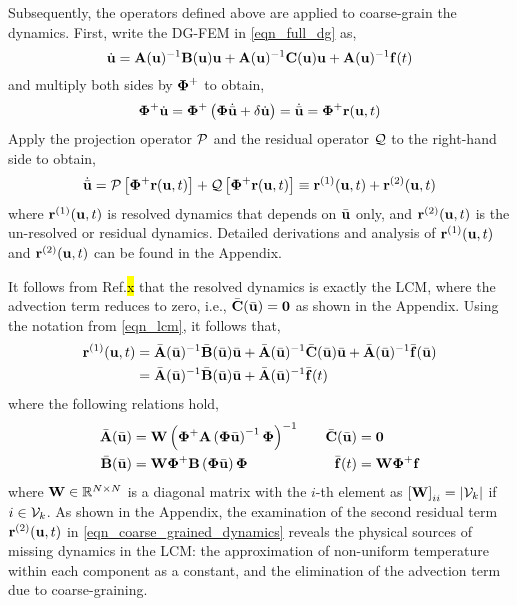 Subsequently, the operators defined above are applied to coarse-grain the dynamics. First, write the DG-FEM in \cref{eqn_full_dg} as,
\begin{equation}
    \dot{\mathbf{u}} = \mathbf{A}(\mathbf{u})^{-1}\mathbf{B}(\mathbf{u})\mathbf{u} + \mathbf{A}(\mathbf{u})^{-1}\mathbf{C}(\mathbf{u})\mathbf{u} + \mathbf{A}(\mathbf{u})^{-1}\mathbf{f}(t)\label{eqn_full_dg_rearranged}
\end{equation}
and multiply both sides by $\boldsymbol{\Phi}^{+}$ to obtain,
\begin{equation}
    \boldsymbol{\Phi}^{+}\dot{\mathbf{u}} = \boldsymbol{\Phi}^{+}\left(\boldsymbol{\Phi}\dot{\bar{\mathbf{u}}} + \delta\dot{\mathbf{u}}\right) = \dot{\bar{\mathbf{u}}} = \boldsymbol{\Phi}^{+}\mathbf{r}(\mathbf{u},t)
\end{equation}
Apply the projection operator $\mathcal{P}$ and the residual operator $\mathcal{Q}$ to the right-hand side to obtain,
\begin{equation}
    \dot{\bar{\mathbf{u}}} = \mathcal{P}\left[\boldsymbol{\Phi}^{+}\mathbf{r}(\mathbf{u},t)\right] + \mathcal{Q}\left[\boldsymbol{\Phi}^{+}\mathbf{r}(\mathbf{u},t)\right]\equiv \mathbf{r}^{(1)}(\mathbf{u},t) + \mathbf{r}^{(2)}(\mathbf{u},t)\label{eqn_coarse_grained_dynamics}
\end{equation}
where $\mathbf{r}^{(1)}(\mathbf{u},t)$ is resolved dynamics that depends on $\bar{\mathbf{u}}$ only, and $\mathbf{r}^{(2)}(\mathbf{u},t)$ is the un-resolved or residual dynamics. Detailed derivations and analysis of $\mathbf{r}^{(1)}(\mathbf{u},t)$ and $\mathbf{r}^{(2)}(\mathbf{u},t)$ can be found in the Appendix. 

It follows from Ref.\hl{x} that the resolved dynamics is exactly the LCM, where the advection term reduces to zero, i.e., $\bar{\mathbf{C}}(\bar{\mathbf{u}}) = \boldsymbol{0}$ as shown in the Appendix. Using the notation from \cref{eqn_lcm}, it follows that,
\begin{align}
    \mathbf{r}^{(1)}(\mathbf{u},t) &= \bar{\mathbf{A}}(\bar{\mathbf{u}})^{-1}\bar{\mathbf{B}}(\bar{\mathbf{u}})\bar{\mathbf{u}} + \bar{\mathbf{A}}(\bar{\mathbf{u}})^{-1}\bar{\mathbf{C}}(\bar{\mathbf{u}})\bar{\mathbf{u}} + \bar{\mathbf{A}}(\bar{\mathbf{u}})^{-1}\bar{\mathbf{f}}(\bar{\mathbf{u}})\notag\\
    &= \bar{\mathbf{A}}(\bar{\mathbf{u}})^{-1}\bar{\mathbf{B}}(\bar{\mathbf{u}})\bar{\mathbf{u}} + \bar{\mathbf{A}}(\bar{\mathbf{u}})^{-1}\bar{\mathbf{f}}(t)\label{eqn_resolved_dynamics_no_advection}
\end{align}
where the following relations hold,
\begin{subequations}
    \begin{align}
        \bar{\mathbf{A}}(\bar{\mathbf{u}}) &= \mathbf{W}\left(\boldsymbol{\Phi}^{+}\mathbf{A}\left(\boldsymbol{\Phi}\bar{\mathbf{u}}\right)^{-1}\boldsymbol{\Phi}\right)^{-1} &\quad \bar{\mathbf{C}}(\bar{\mathbf{u}}) &= \boldsymbol{0} \\
        \bar{\mathbf{B}}(\bar{\mathbf{u}}) &= \mathbf{W}\boldsymbol{\Phi}^{+}\mathbf{B}\left(\boldsymbol{\Phi}\bar{\mathbf{u}}\right)\boldsymbol{\Phi} &\quad \bar{\mathbf{f}}(t) &= \mathbf{W}\boldsymbol{\Phi}^{+}\mathbf{f}
    \end{align}\label{eqn_coarse_grained_matrices}
\end{subequations}
where $\mathbf{W}\in\mathbb{R}^{N\times N}$ is a diagonal matrix with the $i$-th element as $\left[\mathbf{W}\right]_{ii} = \left|\mathcal{V}_k\right|$ if $i\in\mathcal{V}_k$. As shown in the Appendix, the examination of the second residual term $\mathbf{r}^{(2)}(\mathbf{u},t)$ in \cref{eqn_coarse_grained_dynamics} reveals the physical sources of missing dynamics in the LCM: the approximation of non-uniform temperature within each component as a constant, and the elimination of the advection term due to coarse-graining.

